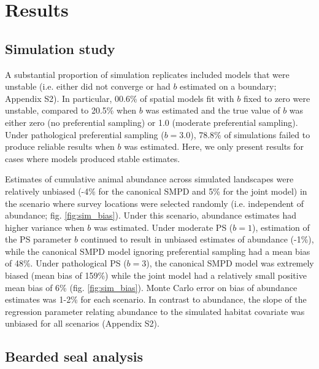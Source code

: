 \documentclass[times,mee,doublespace,]{besauth2}
\begin{document}
\section{Results}

\subsection{Simulation study}

A substantial proportion of simulation replicates included models that were unstable (i.e. either did not converge or had $b$ estimated on a boundary; Appendix S2).  In particular, 00.6\% of spatial models fit with $b$ fixed to zero were unstable, compared to  20.5\% when $b$ was estimated and the true value of $b$ was either zero (no preferential sampling) or 1.0 (moderate preferential sampling).  Under pathological preferential sampling ($b=3.0$), 78.8\% of simulations failed to produce reliable results when $b$ was estimated.  Here, we only present results for cases where models produced stable estimates.

Estimates of cumulative animal abundance across simulated landscapes were relatively unbiased (-4\% for the canonical SMPD and 5\% for the joint model) in the scenario where survey locations were selected randomly (i.e. independent of abundance; fig. \ref{fig:sim_bias}).  Under this scenario, abundance estimates had higher variance when $b$ was estimated.  Under moderate PS ($b=1$), estimation of the PS parameter $b$ continued to result in unbiased estimates of abundance (-1\%), while the canonical SMPD model ignoring preferential sampling had a mean bias of 48\%.  Under pathological PS ($b=3$), the canonical SMPD model was extremely biased (mean bias of 159\%) while the joint model had a relatively small positive mean bias of 6\% (fig. \ref{fig:sim_bias}).  Monte Carlo error on bias of abundance estimates was 1-2\% for each scenario.  In contrast to abundance, the slope of the regression parameter relating abundance to the simulated habitat covariate was unbiased for all scenarios (Appendix S2).


\subsection{Bearded seal analysis}
\end{document}
